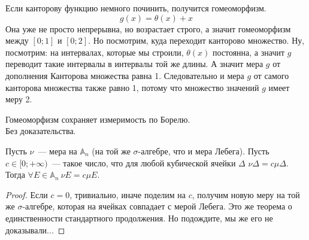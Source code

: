 \documentclass{article}
\begin{document}
    \begin{example}
        Если канторову функцию немного починить, получится гомеоморфизм.
        $$
        g(x)=\theta(x)+x
        $$
        Она уже не просто непрерывна, но возрастает строго, а значит гомеоморфизм между $[0;1]$ и $[0;2]$. Но посмотрим, куда переходит канторово множество. Ну, посмотрим: на интервалах, которые мы строили, $\theta(x)$ постоянна, а значит $g$ переводит такие интервалы в интервалы той же длины. А значит мера $g$ от дополнения Канторова множества равна 1. Следовательно и мера $g$ от самого канторова множества также равно 1, потому что множество значений $g$ имеет меру 2.
    \end{example}
    \begin{claim}
        Гомеоморфизм сохраняет измеримость по Борелю.\\
        Без доказательства.
    \end{claim}
    \begin{lemma}
        Пусть $\nu$~--- мера на $\mathbb A_n$ (на той же $\sigma$-алгебре, что и мера Лебега). Пусть $c\in[0;+\infty)$~--- такое число, что для любой кубической ячейки $\Delta$ $\nu\Delta=c\mu\Delta$. Тогда $\forall E\in\mathbb A_n~\nu E=c\mu E$.
    \end{lemma}
    \begin{proof}
        Если $c=0$, тривиально, иначе поделим на $c$, получим новую меру на той же $\sigma$-алгебре, которая на ячейках совпадает с мерой Лебега. Это же теорема о единственности стандартного продолжения. Но подождите, мы же его не доказывали...
    \end{proof}
\end{document}
